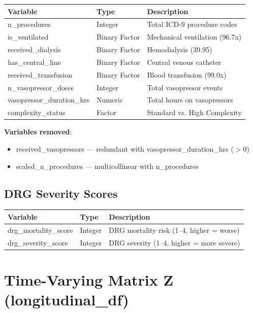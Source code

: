 \documentclass[11pt]{article}
\begin{document}
\begin{longtable}{L{4.5cm}L{2cm}L{7.5cm}}
\toprule
\textbf{Variable} & \textbf{Type} & \textbf{Description} \\
\midrule
\endhead
n\_procedures & Integer & Total ICD-9 procedure codes \\
is\_ventilated & Binary Factor & Mechanical ventilation (96.7x) \\
received\_dialysis & Binary Factor & Hemodialysis (39.95) \\
has\_central\_line & Binary Factor & Central venous catheter \\
received\_transfusion & Binary Factor & Blood transfusion (99.0x) \\
n\_vasopressor\_doses & Integer & Total vasopressor events \\
vasopressor\_duration\_hrs & Numeric & Total hours on vasopressors \\
complexity\_status & Factor & Standard vs. High Complexity \\
\bottomrule
\end{longtable}

\textbf{Variables removed}:
\begin{itemize}[leftmargin=*, nosep]
    \item received\_vasopressors --- redundant with vasopressor\_duration\_hrs ($>0$)
    \item scaled\_n\_procedures --- multicollinear with n\_procedures
\end{itemize}

\subsection{DRG Severity Scores}

\begin{longtable}{L{4cm}L{2cm}L{8cm}}
\toprule
\textbf{Variable} & \textbf{Type} & \textbf{Description} \\
\midrule
\endhead
drg\_mortality\_score & Integer & DRG mortality risk (1--4, higher = worse) \\
drg\_severity\_score & Integer & DRG severity (1--4, higher = more severe) \\
\bottomrule
\end{longtable}

\section{Time-Varying Matrix Z (longitudinal\_df)}
\end{document}
